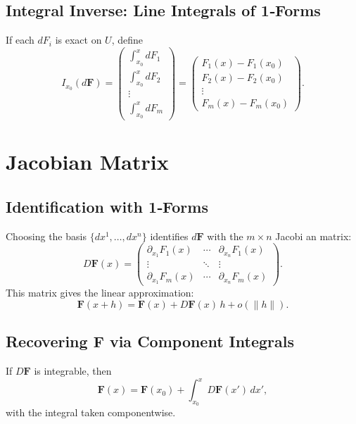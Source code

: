 \documentclass[12pt]{article}
\theoremstyle{definitionstyle}
\begin{document}
\subsection{Integral Inverse: Line Integrals of 1‐Forms}

If each \(dF_i\) is exact on \(U\), define
\[
I_{x_0}(d\mathbf F)
=\begin{pmatrix}
	\int_{x_0}^x dF_1\\
	\int_{x_0}^x dF_2\\
	\vdots\\
	\int_{x_0}^x dF_m
\end{pmatrix}
=
\begin{pmatrix}
	F_1(x)-F_1(x_0)\\
	F_2(x)-F_2(x_0)\\
	\vdots\\
	F_m(x)-F_m(x_0)
\end{pmatrix}.
\]

\bigskip

\section{Jacobian Matrix}

\subsection{Identification with 1‐Forms}

Choosing the basis \(\{dx^1,\dots,dx^n\}\) identifies \(d\mathbf F\) with the \(m\times n\) Jacobi an matrix:
\[
D\mathbf F(x)
=\begin{pmatrix}
	\partial_{x_1}F_1(x) & \cdots & \partial_{x_n}F_1(x)\\
	\vdots & \ddots & \vdots\\
	\partial_{x_1}F_m(x) & \cdots & \partial_{x_n}F_m(x)
\end{pmatrix}.
\]
This matrix gives the linear approximation:
\[
\mathbf F(x+h)
= \mathbf F(x) + D\mathbf F(x)\,h + o(\|h\|).
\]

\subsection{Recovering \(\mathbf F\) via Component Integrals}

If \(D\mathbf F\) is integrable, then
\[
\mathbf F(x)
=\mathbf F(x_0)
+\int_{x_0}^x D\mathbf F(x')\,dx',
\]
with the integral taken componentwise.

\bigskip
\end{document}
